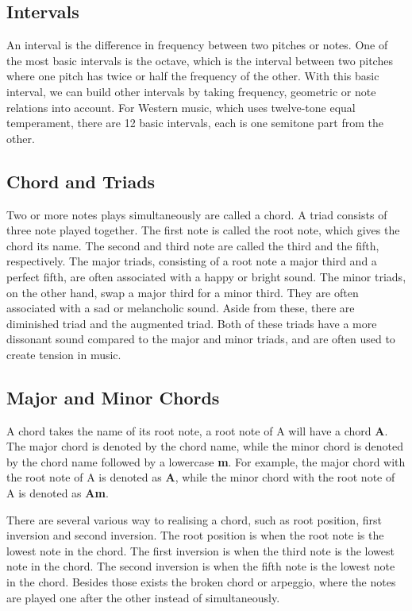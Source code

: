 \documentclass[a4paper, 9pt, twocolumn]{extarticle}
\begin{document}
\subsection{Intervals}
\label{subsection:intervals}
An interval is the difference in frequency between two pitches or notes.\cite{Mueller21_FMP_SPRINGER} One of the most basic intervals is the octave, which is the interval between two pitches where one pitch has twice or half the frequency of the other.
With this basic interval, we can build other intervals by taking frequency, geometric or note relations into account.
For Western music, which uses twelve-tone equal temperament, there are 12 basic intervals, each is one semitone part from the other.

\subsection{Chord and Triads}
\label{subsection:triads}
Two or more notes plays simultaneously are called a chord.\cite{karolyi1965introducing} A triad consists of three note played together.
The first note is called the root note, which gives the chord its name. The second and third note are called the third and the fifth, respectively. The major triads, consisting of a root note a major third and a perfect fifth, are often associated with a happy or bright sound. The minor triads, on the other hand, swap a major third for a minor third. They are often associated with a sad or melancholic sound. Aside from these, there are diminished triad and the augmented triad. Both of these triads have a more dissonant sound compared to the major and minor triads, and are often used to create tension in music.

\subsection{Major and Minor Chords}
\label{subsection:major_minor}
A chord takes the name of its root note, a root note of A will have a chord \textbf{A}. The major chord is denoted by the chord name, while the minor chord is denoted by the chord name followed by a lowercase \textbf{m}. For example, the major chord with the root note of A is denoted as \textbf{A}, while the minor chord with the root note of A is denoted as \textbf{Am}.

There are several various way to realising a chord, such as root position, first inversion and second inversion. The root position is when the root note is the lowest note in the chord. The first inversion is when the third note is the lowest note in the chord. The second inversion is when the fifth note is the lowest note in the chord. Besides those exists the broken chord or arpeggio, where the notes are played one after the other instead of simultaneously. 
\end{document}
